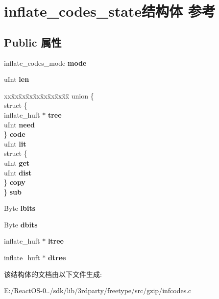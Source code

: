 \hypertarget{structinflate__codes__state}{}\section{inflate\+\_\+codes\+\_\+state结构体 参考}
\label{structinflate__codes__state}
\subsection*{Public 属性}
\begin{DoxyCompactItemize}
\item 
\mbox{\label{structinflate__codes__state_a3e49c20a3b136773bc284f8663b2ff3e}} 
inflate\+\_\+codes\+\_\+mode {\bfseries mode}
\item 
\mbox{\label{structinflate__codes__state_a587855c033e7a4d2bae6db2d063911d1}} 
u\+Int {\bfseries len}
\item 
\mbox{\label{structinflate__codes__state_ad13ea4311db77d21cd1c3aed98889dd2}} 
\begin{tabbing}
xx\=xx\=xx\=xx\=xx\=xx\=xx\=xx\=xx\=\kill
union \{\\
\>struct \{\\
\>\>inflate\_huft $\ast$ {\bfseries tree}\\
\>\>uInt {\bfseries need}\\
\>\} {\bfseries code}\\
\>uInt {\bfseries lit}\\
\>struct \{\\
\>\>uInt {\bfseries get}\\
\>\>uInt {\bfseries dist}\\
\>\} {\bfseries copy}\\
\} {\bfseries sub}\\

\end{tabbing}\item 
\mbox{\label{structinflate__codes__state_a3962907dadd1f3ff9bcaae5810676c14}} 
Byte {\bfseries lbits}
\item 
\mbox{\label{structinflate__codes__state_a31889987198fbd60c57005306adabb46}} 
Byte {\bfseries dbits}
\item 
\mbox{\label{structinflate__codes__state_abf443b09dacdf4061524b0556c3932dd}} 
inflate\+\_\+huft $\ast$ {\bfseries ltree}
\item 
\mbox{\label{structinflate__codes__state_ac0b2b7ff52166b8facf9e2551a14ee46}} 
inflate\+\_\+huft $\ast$ {\bfseries dtree}
\end{DoxyCompactItemize}


该结构体的文档由以下文件生成\+:\begin{DoxyCompactItemize}
\item 
E\+:/\+React\+O\+S-\/0../sdk/lib/3rdparty/freetype/src/gzip/infcodes.\+c\end{DoxyCompactItemize}
